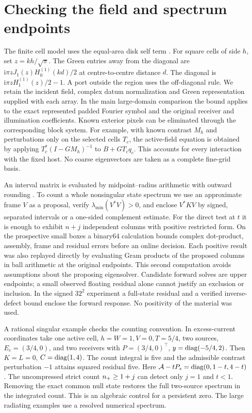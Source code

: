 \section{Checking the field and spectrum endpoints}\label{app:tech}
The finite cell model uses the equal-area disk self term \cite{richmond}. For square cells of side $h$, set $z=kh/\sqrt\pi$. The Green entries away from the diagonal are $\mathrm i\pi zJ_1(z) H_0^{(1)}(k d)/2$ at centre-to-centre distance $d$. The diagonal is $\mathrm i\pi z H_1^{(1)}(z)/2-1$. A port outside the region uses the off-diagonal rule. We retain the incident field, complex datum normalization and Green representation supplied with each array. In the main large-domain comparison the bound applies to the exact represented padded Fourier symbol and the original receiver and illumination coefficients. Known exterior pixels can be eliminated through the corresponding block system. For example, with known contrast $M_h$ and perturbations only on the selected cells $T_c$, the active-field equation is obtained by applying $T_c^*(I-GM_h)^{-1}$ to $B+G T_cq_c$. This accounts for every interaction with the fixed host. No coarse eigenvectors are taken as a complete fine-grid basis.

An interval matrix is evaluated by midpoint--radius arithmetic with outward rounding \cite{arb}. To count a whole nonsingular state spectrum we use an approximate frame $V$ as a proposal, verify $\lambda_{\min}(V^*V)>0$, and enclose $V^*KV$ by signed, separated intervals or a one-sided complement estimate. For the direct test at $t$ it is enough to exhibit $n+j$ independent columns with positive restricted form. On the prospective small boxes a binary64 calculation bounds complex dot-product, assembly, frame and residual errors before an online decision. Each positive result was also replayed directly by evaluating Gram products of the proposed columns in ball arithmetic at the original endpoints. This second computation avoids assumptions about the proposing eigensolver. Candidate forward solves are upper endpoints; a small observed floating residual alone cannot justify an exclusion or inclusion. In the signed $32^2$ experiment a full-state residual and a verified inverse-defect bound enclose the forward response. No positivity of the material was used.

A rational singular example checks the counting convention. In excess-current coordinates take one active cell, $h=W=1,V=0,T=5/4$, two sources, $E_c=(3/4,0)$, and two receivers with $P=(3/4,0)^\top$, $y=\operatorname{diag}(-5/4,2)$. Then $K=L=0$, $C=\operatorname{diag}(1,4)$. The count integral is five and the admissible contrast perturbation $-1$ attains squared residual five. Here $\mathcal A-tP_s=\operatorname{diag}(0,1-t,4-t)$. The uncompressed strict count $n_{+}\ge1+j$ can detect only $j=1$ and $t<1$. Removing the exact common null state restores the full two-source spectrum in the integrated count. This is an algebraic control for a persistent zero. The large radiating examples use a resolved numerical spectrum.

